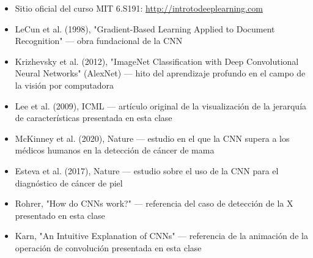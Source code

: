 \documentclass[a4paper]{article}
\begin{document}
\begin{itemize}
    \item Sitio oficial del curso MIT 6.S191: \url{http://introtodeeplearning.com}
    \item LeCun et al. (1998), "Gradient-Based Learning Applied to Document Recognition" — obra fundacional de la CNN
    \item Krizhevsky et al. (2012), "ImageNet Classification with Deep Convolutional Neural Networks" (AlexNet) — hito del aprendizaje profundo en el campo de la visión por computadora
    \item Lee et al. (2009), ICML — artículo original de la visualización de la jerarquía de características presentada en esta clase
    \item McKinney et al. (2020), Nature — estudio en el que la CNN supera a los médicos humanos en la detección de cáncer de mama
    \item Esteva et al. (2017), Nature — estudio sobre el uso de la CNN para el diagnóstico de cáncer de piel
    \item Rohrer, "How do CNNs work?" — referencia del caso de detección de la X presentado en esta clase
    \item Karn, "An Intuitive Explanation of CNNs" — referencia de la animación de la operación de convolución presentada en esta clase
\end{itemize}

\end{document}
